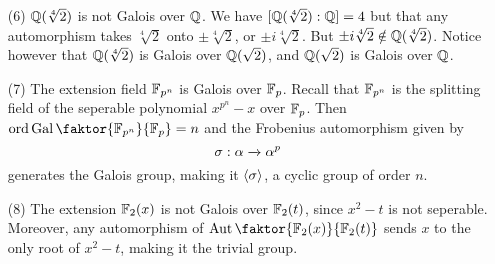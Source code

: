 \begin{example}
\begin{enumerate}
        \item[(6)] $\mathbb{Q}(\sqrt[4]{2})$ is not Galois over $\mathbb{Q}$. We have
            $[\mathbb{Q}(\sqrt[4]{2}) : \mathbb{Q}]=4$ but that any automorphism takes
            $\sqrt[4]{2}$ onto $\pm \sqrt[4]{2}$, or $\pm i\sqrt[4]{2}$. But
            $\pm i\sqrt[4]{2} \notin \mathbb{Q}(\sqrt[4]{2})$. Notice however that
            $\mathbb{Q}(\sqrt[4]{2})$ is Galois over $\mathbb{Q}(\sqrt{2})$, and $\mathbb{Q}(\sqrt{2})$
            is Galois over $\mathbb{Q}$.

        \item[(7)] The extension field $\mathbb{F}_{p^n}$ is Galois over $\mathbb{F}_p$.  Recall
            that $\mathbb{F}_{p^n}$ is the splitting field of the seperable polynomial
            $x^{p^n}-x$ over $\mathbb{F}_p$. Then
            $\ord{\Gal{\faktor{\F_{p^n}}{\F_p}}}=n$ and the Frobenius
            automorphism given by
            \begin{equation*}
                \sigma:\alpha \xrightarrow{} \alpha^p
            \end{equation*}
            generates the Galois group, making it $\langle \sigma \rangle$, a cyclic
            group of order $n$.

        \item[(8)] The extension $\mathbb{F}_2(x)$ is not Galois over $\mathbb{F}_2(t)$, since
            $x^2-t$ is not seperable. Moreover, any automorphism of
            $\Aut{\faktor{\F_2(x)}{\F_2(t)}}$ sends $x$ to the only root of
            $x^2-t$, making it the trivial group.
    \end{enumerate}
\end{example}
